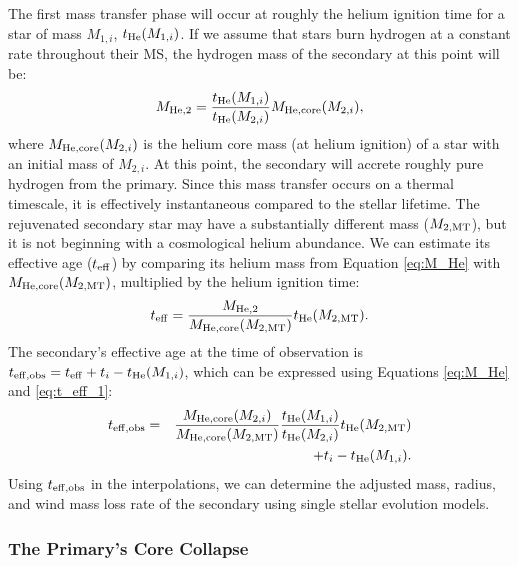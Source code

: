 \documentclass[usenatbib]{mnras}
\begin{document}
The first mass transfer phase will occur at roughly the helium ignition time for a star of mass $M_{1,i}$, $t_{\rm He} (M_{1,i})$. If we assume that stars burn hydrogen at a constant rate throughout their MS, the hydrogen mass of the secondary at this point will be:
\begin{equation}
M_{\rm He,2} = \frac{t_{\rm He}(M_{1,i})}{t_{\rm He}(M_{2,i})} M_{\rm He,core}(M_{2,i}), \label{eq:M_He}
\end{equation}
where $M_{\rm He,core}(M_{2,i})$ is the helium core mass (at helium ignition) of a star with an initial mass of $M_{2,i}$. At this point, the secondary will accrete roughly pure hydrogen from the primary. Since this mass transfer occurs on a thermal timescale, it is effectively instantaneous compared to the stellar lifetime. The rejuvenated secondary star may have a substantially different mass ($M_{\rm 2, MT}$), but it is not beginning with a cosmological helium abundance. We can estimate its effective age ($t_{\rm eff}$) by comparing its helium mass from Equation \ref{eq:M_He} with $M_{\rm He,core}(M_{\rm 2, MT})$, multiplied by the helium ignition time:
\begin{equation}
t_{\rm eff} = \frac{M_{\rm He, 2}}{M_{\rm He, core} (M_{\rm 2, MT}) } t_{\rm He} (M_{\rm 2, MT}). \label{eq:t_eff_1}
\end{equation}
The secondary's effective age at the time of observation is $t_{\rm eff,obs} = t_{\rm eff} + t_i - t_{\rm He}(M_{1,i})$, which can be expressed using Equations \ref{eq:M_He} and \ref{eq:t_eff_1}:
\begin{eqnarray}
t_{\rm eff,obs} &=& \frac{M_{\rm He,core}(M_{2,i})}{M_{\rm He,core}(M_{\rm 2, MT})} \frac{t_{\rm He}(M_{1,i})}{t_{\rm He}(M_{2,i})} t_{\rm He}(M_{\rm 2, MT}) \nonumber \\
 & & \qquad + t_i - t_{\rm He}(M_{1,i}). \label{eq:t_eff_obs_full}
\end{eqnarray}
Using $t_{\rm eff,obs}$ in the interpolations, we can determine the adjusted mass, radius, and wind mass loss rate of the secondary using single stellar evolution models. 


\subsubsection{The Primary's Core Collapse} \label{sec:trans_SN}
\end{document}
